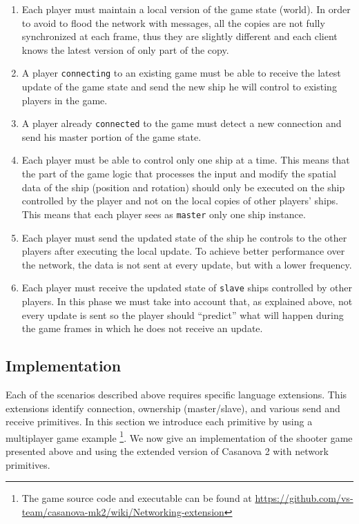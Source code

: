 \begin{enumerate}
	\item Each player must maintain a local version of the game state (world). In order to avoid to flood the network with messages, all the copies are not fully synchronized at each frame, thus they are slightly different and each client knows the latest version of only part of the copy.
	\item A player \texttt{connecting} to an existing game must be able to receive the latest update of the game state and send the new ship he will control to existing players in the game.
	\item A player already \texttt{connected} to the game must detect a new connection and send his master portion of the game state.
	\item Each player must be able to control only one ship at a time. This means that the part of the game logic that processes the input and modify the spatial data of the ship (position and rotation) should only be executed on the ship controlled by the player and not on the local copies of other players' ships. This means that each player sees as \texttt{master} only one ship instance.
	\item Each player must send the updated state of the ship he controls to the other players after executing the local update. To achieve better performance over the network, the data is not sent at every update, but with a lower frequency.
	\item Each player must receive the updated state of \texttt{slave} ships controlled by other players. In this phase we must take into account that, as explained above, not every update is sent so the player should ``predict'' what will happen during the game frames in which he does not receive an update.
\end{enumerate}

\subsection{Implementation}
Each of the scenarios described above requires specific language extensions. This extensions identify connection, ownership (master/slave), and various send and receive primitives. In this section we introduce each primitive by using a multiplayer game example \footnote{The game source code and executable can be found at \url{https://github.com/vs-team/casanova-mk2/wiki/Networking-extension}}. We now give an implementation of the shooter game presented above and using the extended version of Casanova 2 with network primitives. 

